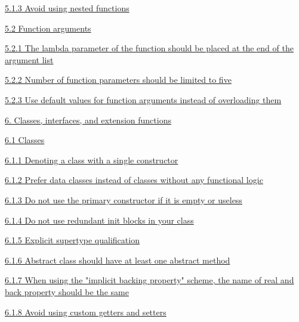 {{{{{{{{{{{{{{{{\hspace{1.0cm}\hyperref[sec:5.1.3]{ 5.1.3 Avoid using nested functions}

\hspace{0.5cm}\hyperref[sec:5.2]{ 5.2 Function arguments}

\hspace{1.0cm}\hyperref[sec:5.2.1]{ 5.2.1 The lambda parameter of the function should be placed at the end of the argument list}

\hspace{1.0cm}\hyperref[sec:5.2.2]{ 5.2.2 Number of function parameters should be limited to five}

\hspace{1.0cm}\hyperref[sec:5.2.3]{ 5.2.3 Use default values for function arguments instead of overloading them}

\hspace{0.0cm}\hyperref[sec:]{}

\hspace{0.0cm}\hyperref[sec:6.]{6. Classes, interfaces, and extension functions}

\hspace{0.5cm}\hyperref[sec:6.1]{ 6.1 Classes}

\hspace{1.0cm}\hyperref[sec:6.1.1]{ 6.1.1 Denoting a class with a single constructor}

\hspace{1.0cm}\hyperref[sec:6.1.2]{ 6.1.2 Prefer data classes instead of classes without any functional logic}

\hspace{1.0cm}\hyperref[sec:6.1.3]{ 6.1.3 Do not use the primary constructor if it is empty or useless}

\hspace{1.0cm}\hyperref[sec:6.1.4]{ 6.1.4 Do not use redundant init blocks in your class}

\hspace{1.0cm}\hyperref[sec:6.1.5]{ 6.1.5 Explicit supertype qualification}

\hspace{1.0cm}\hyperref[sec:6.1.6]{ 6.1.6 Abstract class should have at least one abstract method}

\hspace{1.0cm}\hyperref[sec:6.1.7]{ 6.1.7 When using the "implicit backing property" scheme, the name of real and back property should be the same}

\hspace{1.0cm}\hyperref[sec:6.1.8]{ 6.1.8 Avoid using custom getters and setters}

}}}}}}}}}}}}}}}}
